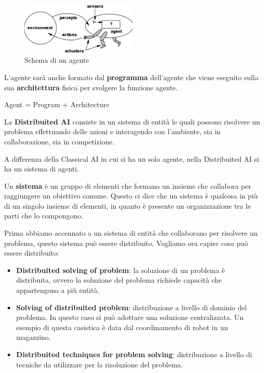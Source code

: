 \begin{figure}[!ht]
    \centering
    \includegraphics[width=0.5\textwidth]{./img/Agenti/AgenteEAmbiente.png}
    \caption{Schema di un agente}
    \label{fig:agenti}
\end{figure}

L'agente sarà anche formato dal \textbf{programma} dell'agente che viene
eseguito sulla sua \textbf{architettura} fisica per svolgere la funzione agente.
\begin{center}
    Agent = Program + Architecture
\end{center}
\begin{definizione} 
    La \textbf{Distribuited AI} consiste in un sistema di entità le quali possono
    risolvere un problema effettuando delle azioni e interagendo con l'ambiente,
    sia in collaborazione, sia in competizione.
\end{definizione}
A differenza della Classical AI in cui si ha un solo agente, nella Distribuited AI
si ha un sistema di agenti.
\begin{definizione} 
    Un \textbf{sistema} è un gruppo di elementi che formano un insieme che
    collabora per raggiungere un obiettivo comune. Questo ci dice che un sistema
    è qualcosa in più di un singolo insieme di elementi, in quanto è presente un
    organizzazione tra le parti che lo compongono.
\end{definizione}
Prima abbiamo accennato a un sistema di entità che collaborano per risolvere un
problema, questo sistema può essere distribuito. Vogliamo ora capire cosa
può essere distribuito:
\begin{itemize}
    \item \textbf{Distribuited solving of problem}: la soluzione di un problema
          è distribuita, ovvero la soluzione del problema richiede capacità che
          appartengono a più entità.
    \item \textbf{Solving of distribuited problem}: distribuzione a livello di
          dominio del problema. In questo caso si può adottare una soluzione
          centralizzata. Un esempio di questa casistica è data dal coordinamento
          di robot in un magazzino.
    \item \textbf{Distribuited techniques for problem solving}: distribuzione a
          livello di tecniche da utilizzare per la risoluzione del problema.
\end{itemize}
